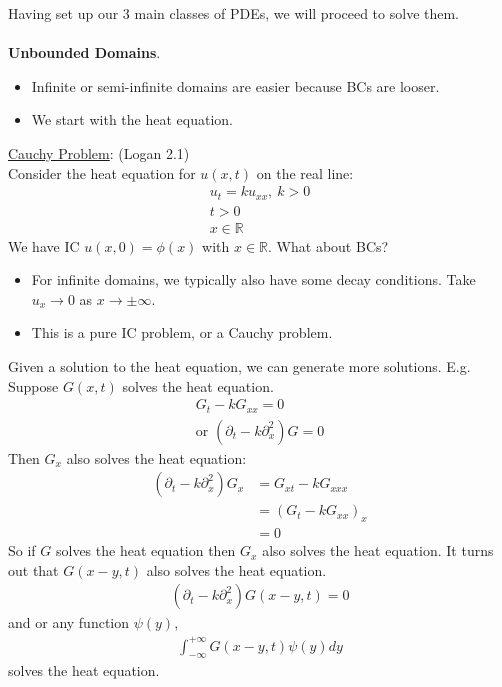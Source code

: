 \documentclass[12pt, letterpaper]{article}
\begin{document}
Having set up our 3 main classes of PDEs, we will proceed to solve them. \\ \\
\textbf{Unbounded Domains}.
\begin{itemize}
    \item Infinite or semi-infinite domains are easier because BCs are looser.
    \item We start with the heat equation.
\end{itemize}
\underline{Cauchy Problem}: (Logan 2.1) \\
Consider the heat equation for $u(x,t)$ on the real line:
\begin{align*}
    u_t = ku_{xx},\ k > 0 \\
    t > 0 \\
    x \in \mathbb{R} 
\end{align*}
We have IC $u(x,0) = \phi(x)$ with $x \in \mathbb{R}$. What about BCs?
\begin{itemize}
    \item For infinite domains, we typically also have some decay conditions. Take $u_x 
    \rightarrow 0$ as $x \rightarrow \pm \infty$.
    \item This is a pure IC problem, or a Cauchy problem.
\end{itemize}
Given a solution to the heat equation, we can generate more solutions. E.g. Suppose $G(x,t)$
solves the heat equation. 
\begin{align*}
    G_t - kG_{xx} = 0 \\
   \text{or } (\partial_t -k\partial^2_x) G = 0 
\end{align*}
Then $G_x$ also solves the heat equation:
\begin{align*}
    (\partial_t -k\partial^2_x) G_x &= G_{xt} - kG_{xxx} \\
    &= (G_t - kG_{xx})_x \\
    &= 0
\end{align*}
So if $G$ solves the heat equation then $G_x$ also solves the heat equation. It turns out that 
$G(x-y,t)$ also solves the heat equation.
\begin{align*}
    (\partial_t -k\partial^2_x) G(x-y,t) = 0 
\end{align*}
and or any function $\psi(y)$,
\begin{align*}
    \int_{-\infty}^{+\infty} G(x-y, t) \psi(y)dy
\end{align*}
solves the heat equation. \\ \\ 
\end{document}
